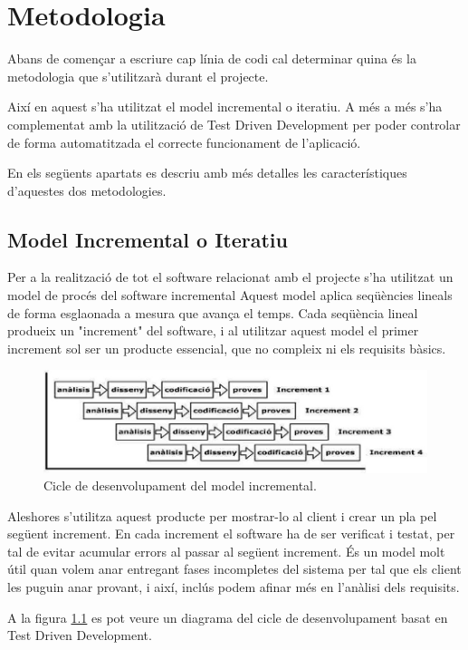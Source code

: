 \chapter{Metodologia}
\label{chap:metodologia}

Abans de començar a escriure cap línia de codi cal determinar quina és la metodologia que s'utilitzarà durant el projecte. 

Així en aquest s'ha utilitzat el model incremental o iteratiu. A més a més s'ha complementat amb la utilització de Test Driven Development per poder controlar de forma automatitzada el correcte funcionament de l'aplicació.

En els següents apartats es descriu amb més detalles les característiques d'aquestes dos metodologies.  


\section{Model Incremental o Iteratiu}

Per a la realització de tot el software relacionat amb el projecte s’ha utilitzat un model de procés del software incremental Aquest model aplica seqüències lineals de forma esglaonada a mesura que avança el temps. Cada seqüència lineal produeix un "increment" del software, i al utilitzar aquest model el primer increment sol ser un producte essencial, que no compleix ni els requisits bàsics.

\begin{figure}[htbp]
\centering\includegraphics{img/model-incremental.png}
\caption{Cicle de desenvolupament del model incremental.}
\label{fig:mii}
\end{figure} 


Aleshores s’utilitza aquest producte per mostrar-lo al client i crear un pla pel següent increment. En cada increment el software ha de ser verificat i testat, per tal de evitar acumular errors al passar al següent increment. És un model molt útil quan volem anar entregant fases incompletes del sistema per tal que els client les puguin anar provant, i així, inclús podem afinar més en l’anàlisi dels requisits.

A la figura \ref{fig:mii} es pot veure un diagrama del cicle de desenvolupament basat en Test Driven Development.

